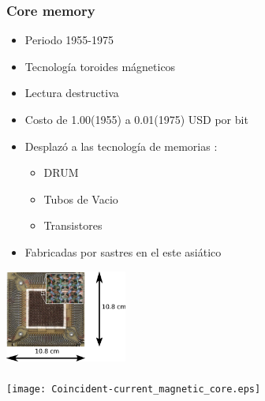 \documentclass{beamer}
\begin{document}
\begin{frame}
\frametitle{Core memory}
\begin{minipage}[c]{7.5cm}
	\begin{itemize}
		\item Periodo 1955-1975
		\item Tecnología toroides mágneticos
		\item Lectura destructiva
		\item Costo de 1.00(1955) a 0.01(1975) USD por bit
		\item Desplazó a las tecnología de memorias :
			\begin{itemize}
				\item DRUM
				\item Tubos de Vacio
				\item Transistores
			\end{itemize}
		\item Fabricadas por sastres en el este asiático
	\end{itemize}
\end{minipage}
\begin{minipage}[c]{4cm}
	\includegraphics[width=4cm]{Ferrite_core_memory.eps} \\ \\
	\texttt{[image: Coincident-current\_magnetic\_core.eps]}
\end{minipage}
\end{frame}
\end{document}
